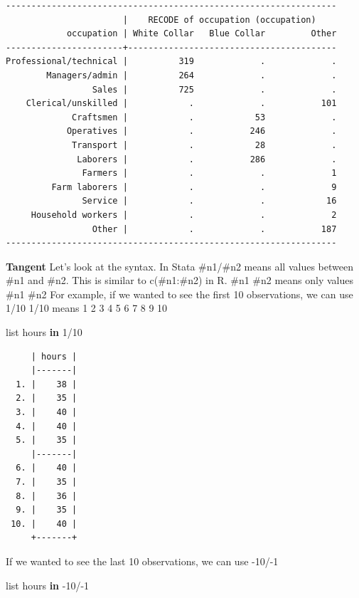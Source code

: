 \documentclass[
]{book}
\newenvironment{Shaded}{\begin{snugshade}}{\end{snugshade}}
\newcommand{\KeywordTok}[1]{\textcolor[rgb]{0.13,0.29,0.53}{\textbf{#1}}}
\newcommand{\NormalTok}[1]{#1}
\newcommand{\OtherTok}[1]{\textcolor[rgb]{0.56,0.35,0.01}{#1}}
\begin{document}
\begin{verbatim}
-----------------------------------------------------------------
                       |    RECODE of occupation (occupation)    
            occupation | White Collar   Blue Collar         Other
-----------------------+-----------------------------------------
Professional/technical |          319             .             .
        Managers/admin |          264             .             .
                 Sales |          725             .             .
    Clerical/unskilled |            .             .           101
             Craftsmen |            .            53             .
            Operatives |            .           246             .
             Transport |            .            28             .
              Laborers |            .           286             .
               Farmers |            .             .             1
         Farm laborers |            .             .             9
               Service |            .             .            16
     Household workers |            .             .             2
                 Other |            .             .           187
-----------------------------------------------------------------
\end{verbatim}

\textbf{Tangent}
Let's look at the syntax. In Stata \#n1/\#n2 means all values between \#n1 and \#n2. This is similar to c(\#n1:\#n2) in R.
\#n1 \#n2 means only values \#n1 \#n2
For example, if we wanted to see the first 10 observations, we can use 1/10
1/10 means 1 2 3 4 5 6 7 8 9 10

\begin{Shaded}
\begin{Highlighting}[]
\OtherTok{list}\NormalTok{ hours }\KeywordTok{in}\NormalTok{ 1/10}
\end{Highlighting}
\end{Shaded}

\begin{verbatim}
     | hours |
     |-------|
  1. |    38 |
  2. |    35 |
  3. |    40 |
  4. |    40 |
  5. |    35 |
     |-------|
  6. |    40 |
  7. |    35 |
  8. |    36 |
  9. |    35 |
 10. |    40 |
     +-------+
\end{verbatim}

If we wanted to see the last 10 observations, we can use -10/-1

\begin{Shaded}
\begin{Highlighting}[]
\OtherTok{list}\NormalTok{ hours }\KeywordTok{in}\NormalTok{ {-}10/{-}1}
\end{Highlighting}
\end{Shaded}
\end{document}
